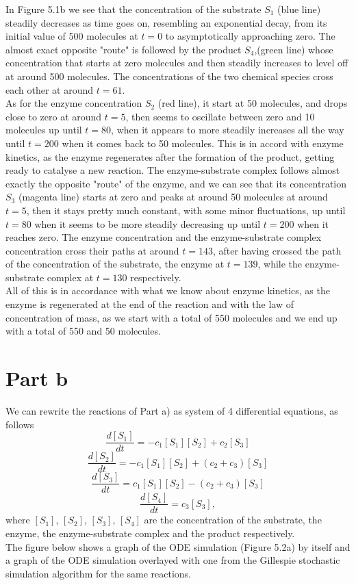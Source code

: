 In Figure 5.1b we see that the concentration of the substrate $S_{1}$ (blue line) steadily decreases as time goes on, resembling an exponential decay, from its initial value of 500 molecules at $t=0$ to asymptotically approaching zero. The almost exact opposite "route" is followed by the product $S_{4}$,(green line) whose concentration that starts at zero molecules and then steadily increases to level off at around 500 molecules. The concentrations of the two chemical species cross each other at around $t=61$.\\
As for the enzyme concentration $S_{2}$ (red line), it start at 50 molecules, and drops close to zero at around $t=5$, then seems to oscillate between zero and 10 molecules up until $t=80$, when it appears to more steadily increases all the way until $t=200$ when it comes back to 50 molecules. This is in accord with enzyme kinetics, as the enzyme regenerates after the formation of the product, getting ready to catalyse a new reaction. The enzyme-substrate complex follows almost exactly the opposite "route" of the enzyme, and we can see that its concentration $S_{3}$ (magenta line) starts at zero and peaks at around 50 molecules at around $t=5$, then it stays pretty much constant, with some minor fluctuations, up until $t=80$ when it seems to be more steadily decreasing up until $t=200$ when it reaches zero. The enzyme concentration and the enzyme-substrate complex concentration cross their paths at around $t=143$, after having crossed the path of the concentration of the substrate, the enzyme at $t=139$, while the enzyme-substrate complex at $t=130$ respectively.\\
All of this is in accordance with what we know about enzyme kinetics, as the enzyme is regenerated at the end of the reaction and with the law of concentration of mass, as we start with a total of 550 molecules and we end up with a total of 550 and 50 molecules.\\
\section{Part b}
We can rewrite the reactions of Part a) as system of 4 differential equations, as follows
$$
\frac{d[S_{1}]}{dt} = -c_{1}[S_{1}][S_{2}] + c_{2}[S_{3}]
$$
$$
\frac{d[S_{2}]}{dt} = -c_{1}[S_{1}][S_{2}] + (c_{2}+c_{3})[S_{3}]
$$
$$
\frac{d[S_{3}]}{dt} = c_{1}[S_{1}][S_{2}] - (c_{2}+c_{3})[S_{3}]
$$
$$
\frac{d[S_{4}]}{dt}  = c_{3}[S_{3}],
$$
where $[S_{1}]$, $[S_{2}]$, $[S_{3}]$, $[S_{4}]$ are the concentration of the substrate, the enzyme, the enzyme-substrate complex and the product respectively.\\
The figure below shows a graph of the ODE simulation (Figure 5.2a) by itself and a graph of the ODE simulation overlayed with one from the Gillespie stochastic simulation algorithm for the same reactions.

